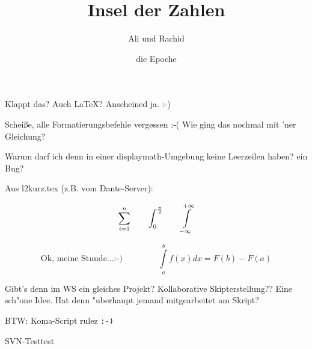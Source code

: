 \documentclass{scrartcl}
\title{Insel der Zahlen}
\author{Ali und Rachid}
\date{die Epoche}
\begin{document}

\maketitle

Klappt das? Auch \LaTeX{}? Anscheined ja. :-)

Scheiße, alle Formatierungsbefehle vergessen :-(
\newline
Wie ging das nochmal mit 'ner Gleichung?

Warum darf ich denn in einer displaymath-Umgebung keine Leerzeilen haben? ein Bug?

Aus l2kurz.tex (z.B. vom Dante-Server):

\begin{displaymath}
\sum_{i=1}^{n} \qquad
\int_{0}^{\frac{\pi}{2}} \qquad
\int \limits_{-\infty}^{+\infty}\\
\end{displaymath}

\begin{displaymath}
\textrm{Ok, meine Stunde}\ldots \texttt{:-)} \qquad \  \qquad
\int \limits_{a}^{b} f(x) d x = F(b) - F(a)
\end{displaymath}

Gibt's denn im WS ein gleiches Projekt? Kollaborative Skipterstellung?? Eine sch"one Idee. Hat denn "uberhaupt jemand mitgearbeitet am Skript?


BTW: Koma-Script rulez \texttt{:-)}

\begin{xy}
\end{xy}

SVN-Testtest
\end{document}
